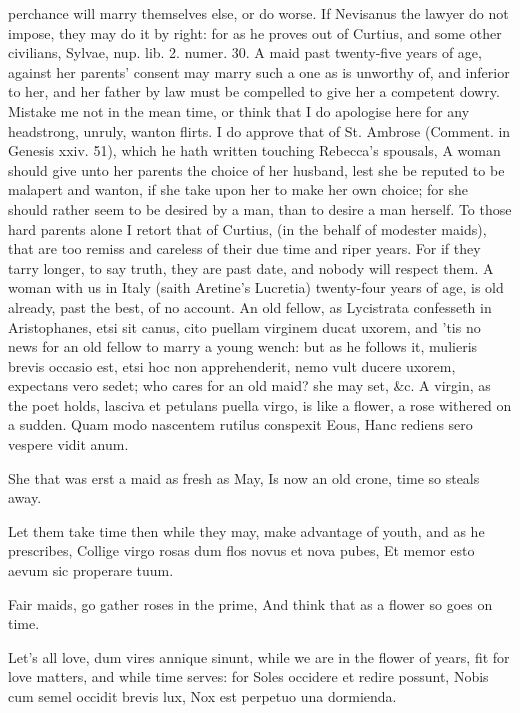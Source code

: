 {perchance will marry themselves else, or do worse. If Nevisanus the
lawyer do not impose, they may do it by right: for as he proves out of
Curtius, and some other civilians, Sylvae, nup. lib. 2. numer. 30.
A maid past twenty-five years of age, against her parents'
consent may marry such a one as is unworthy of, and inferior to her,
and her father by law must be compelled to give her a competent dowry.
Mistake me not in the mean time, or think that I do apologise here for
any headstrong, unruly, wanton flirts. I do approve that of St. Ambrose
(Comment. in Genesis xxiv. 51), which he hath written touching
Rebecca's spousals, A woman should give unto her parents the choice of
her husband, lest she be reputed to be malapert and wanton, if
she take upon her to make her own choice; for she should rather
seem to be desired by a man, than to desire a man herself. To those
hard parents alone I retort that of Curtius, (in the behalf of modester
maids), that are too remiss and careless of their due time and riper
years. For if they tarry longer, to say truth, they are past date, and
nobody will respect them. A woman with us in Italy (saith
Aretine's Lucretia) twenty-four years of age, is old already,
past the best, of no account. An old fellow, as Lycistrata confesseth
in Aristophanes, etsi sit canus, cito puellam virginem ducat
uxorem, and 'tis no news for an old fellow to marry a young wench: but
as he follows it, mulieris brevis occasio est, etsi hoc non
apprehenderit, nemo vult ducere uxorem, expectans vero sedet; who cares
for an old maid? she may set, \&c. A virgin, as the poet holds, lasciva
et petulans puella virgo, is like a flower, a rose withered on a
sudden.
Quam modo nascentem rutilus conspexit Eous,
Hanc rediens sero vespere vidit anum.

She that was erst a maid as fresh as May,
Is now an old crone, time so steals away.

Let them take time then while they may, make advantage of youth, and as
he prescribes,
Collige virgo rosas dum flos novus et nova pubes,
Et memor esto aevum sic properare tuum.

Fair maids, go gather roses in the prime,
And think that as a flower so goes on time.

Let's all love, dum vires annique sinunt, while we are in the flower of
years, fit for love matters, and while time serves: for
Soles occidere et redire possunt,
Nobis cum semel occidit brevis lux,
Nox est perpetuo una dormienda.

}

